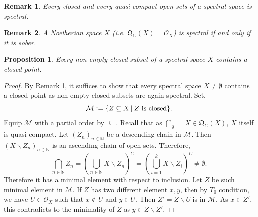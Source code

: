 \documentclass[8pt]{article}
\numberwithin{equation}{section}
\newtheorem{proposition}{Proposition}[subsection]
\newtheorem{remark}{Remark}[subsection]
\newcommand{\defeq}{\vcentcolon=}
\newcommand{\Ouv}{\mathscr{O}}
\newcommand{\N}[0]{\mathbb{N}}
\newcommand{\sep}[0]{\:|\:}
\newcommand{\QC}[0]{\mathfrak{Q}_C}
\begin{document}
\begin{remark}
    \label{remark_example_1_b}
    Every closed and every quasi-compact open sets of a spectral space is spectral.
\end{remark}
\begin{remark}
    A Noetherian space $X$ (i.e. $\QC(X)=\Ouv_X$) is spectral if and only if it is sober.
\end{remark}
\begin{proposition}
    \label{fact_1_2_7}
    \label{proposition_1_2_7}
    Every non-empty closed subset of a spectral space $X$ contains a closed point.
\end{proposition}

\begin{proof}
    By Remark \ref{remark_example_1_b}, it suffices to show that every spectral space $X\not=\emptyset$ contains a closed point as non-empty closed subsets are again spectral. Set,
    \begin{equation*}
        \mathcal{M}\defeq\{Z\subseteq X\sep \text{$Z$ is closed}\}.
    \end{equation*}
    Equip $\mathcal{M}$ with a partial order by $\subseteq$. Recall that as $\bigcap_\emptyset = X\in\QC(X)$, $X$ itself is quasi-compact. Let $(Z_n)_{n\in\N}$ be a descending chain in $\mathcal{M}$. Then $(X\backslash Z_n)_{n\in\N}$ is an ascending chain of open sets. Therefore,
    \begin{equation*}
    \bigcap_{n\in\N}Z_n = \left(\bigcup_{n\in\N}X\backslash Z_n\right)^C = \left(\bigcup_{i=1}^k X\backslash Z_i\right)^C \not =\emptyset.
    \end{equation*}
    Therefore it has a minimal element with respect to inclusion. Let $Z$ be such minimal element in $\mathcal{M}$. If $Z$ has two different element $x,y$, then by $T_0$ condition, we have $U\in\Ouv_X$ such that $x\not\in U$ and $y\in U$. Then $Z'=Z\backslash U$ is in $\mathcal{M}$. As $x\in Z'$, this contradicts to the minimality of $Z$ as $y\in Z\backslash Z'$.
\end{proof}
\end{document}
